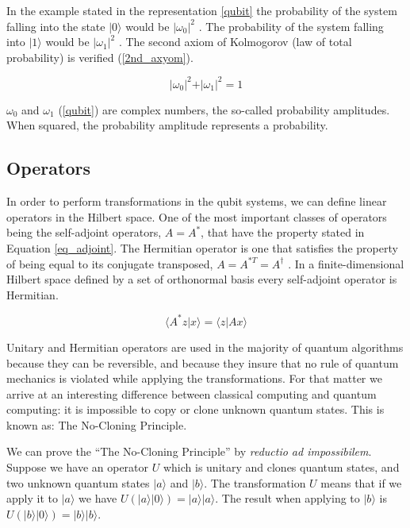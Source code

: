 In the example stated in the representation \ref{qubit} the probability of the system falling into the state $\vert 0 \rangle $ would be $\vert\omega_{0}\vert^{2}$ . The probability of the system falling into $\vert 1 \rangle $ would be $\vert\omega_{1}\vert^{2}$ . The second axiom of Kolmogorov (law of total probability) is verified (\ref{2nd_axyom}).

\begin{equation}
\label{2nd_axyom}
\vert\omega_{0}\vert^{2}+\vert\omega_{1}\vert^{2}=1
\end{equation}

 
$\omega_{0}$ and $\omega_{1}$ (\ref{qubit}) are complex numbers, the so-called probability amplitudes. When squared, the probability amplitude represents a probability. 

\subsection{Operators}
\label{subsec:QCoperators}

In order to perform transformations in the qubit systems, we can define linear operators in the Hilbert space. One of the most important classes of operators being the self-adjoint operators,  $A = A^{*}$, that have the property stated in Equation \ref{eq_adjoint}. The Hermitian operator is one that satisfies the property of being equal to its conjugate transposed, $A = A^{*T} =A^\dagger$ .  In a finite-dimensional Hilbert space defined by a set of orthonormal basis every self-adjoint operator is Hermitian. 

\begin{equation}
\label{eq_adjoint}
\langle A^{*}z\vert x\rangle=\langle z\vert Ax\rangle
\end{equation}

Unitary and Hermitian operators are used in the majority of quantum algorithms because they can be reversible, and because they insure that no rule of quantum mechanics is violated while applying the transformations. For that matter we arrive at an interesting difference between classical computing and quantum computing: it is impossible to copy or clone unknown quantum states\cite{Rieffel2011}. This is known as: The No-Cloning Principle.

We can prove the ``The No-Cloning Principle'' by \textit{reductio ad impossibilem}. Suppose we have an operator $U$ which is unitary and clones quantum states, and two unknown quantum states $\vert a \rangle$ and $\vert  b \rangle$. The transformation $U$ means that if we apply it to $\vert a \rangle$ we have $U(\vert a \rangle\vert 0 \rangle)=\vert a \rangle\vert a \rangle$. The result when applying to $\vert b \rangle$ is  $U(\vert b \rangle\vert 0 \rangle)=\vert b \rangle\vert b \rangle$. 

